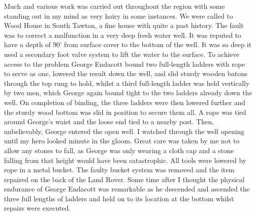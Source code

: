Much and various work was carried out throughout the region with some standing
out in my mind as very hairy in some instances. We were called to Wood House in
South Tawton, a fine house with quite a past history. The fault was to correct
a malfunction in a very deep fresh water well. It was reputed to have a depth
of 90' from surface cover to the bottom of the well. It was so deep it used a
secondary foot valve system to lift the water to the surface. To achieve access
to the problem George Endacott bound two full-length ladders with rope to serve
as one, lowered the result down the well, and slid sturdy wooden batons through
the top rung to hold, whilst a third full-length ladder was held vertically by
two men, which George again bound tight to the two ladders already down the
well. On completion of binding, the three ladders were then lowered further and
the sturdy wood bottom was slid in position to secure them all. A rope was tied
around George's waist and the loose end tied to a nearby post. Then,
unbelievably, George entered the open well. I watched through the well opening
until my hero looked minute in the gloom. Great care was taken by me not to
allow any stones to fall, as George was only wearing a cloth cap and a stone
falling from that height would have been catastrophic. All tools were lowered
by rope in a metal bucket. The faulty bucket system was removed and the item
repaired on the back of the Land Rover. Some time after I thought the physical
endurance of George Endacott was remarkable as he descended and ascended the
three full lengths of ladders and held on to its location at the bottom whilst
repairs were executed.

